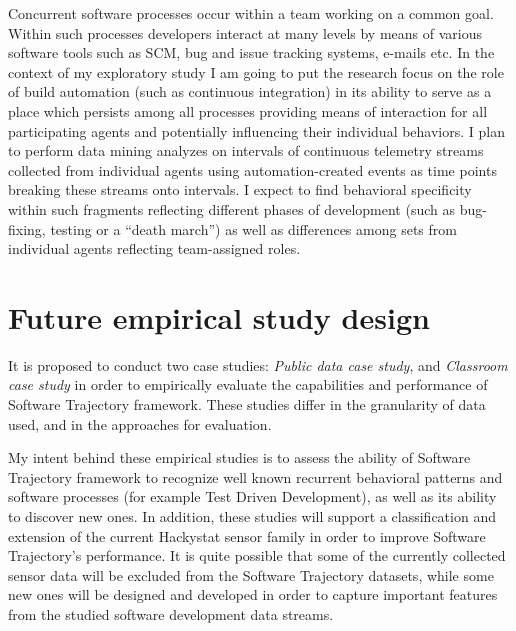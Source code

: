 \documentclass{sig-alternate}
\begin{document}
Concurrent software processes occur within a team working on a common goal. Within such processes developers interact at many levels by means of various software tools such as SCM, bug and issue tracking systems, e-mails etc. In the context of my exploratory study I am going to put the research focus on the role of build automation (such as continuous integration) in its ability to serve as a place which persists among all processes providing means of interaction for all participating agents and potentially influencing their individual behaviors. I plan to perform data mining analyzes on intervals of continuous telemetry streams collected from individual agents using automation-created events as time points breaking these streams onto intervals. I expect to find behavioral specificity within such fragments reflecting different phases of development (such as bug-fixing, testing or a ``death march'') as well as differences among sets from individual agents reflecting team-assigned roles.

\section{Future empirical study design}
It is proposed to conduct two case studies: \textit{Public data case study}, and \textit{Classroom case study} in order to empirically evaluate the capabilities and performance of Software Trajectory framework. These studies differ in the granularity of data used, and in the approaches for evaluation. 

My intent behind these empirical studies is to assess the ability of Software Trajectory framework to recognize well known recurrent behavioral patterns and software processes (for example Test Driven Development), as well as its ability to discover new ones. In addition, these studies will support a classification and extension of the current Hackystat sensor family in order to improve Software Trajectory's performance. It is quite possible that some of the currently collected sensor data will be excluded from the Software Trajectory datasets, while some new ones will be designed and developed in order to capture important features from the studied software development data streams. 
\end{document}
